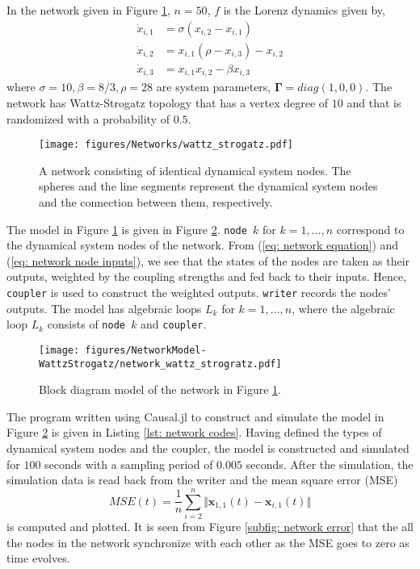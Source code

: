 \documentclass{juliacon}
\begin{document}
{In the network given in Figure \ref{fig: network graph}, $n=50$,  $f$ is the Lorenz dynamics given by,
\begin{equation}
    \begin{split}
        \dot{x}_{i,1} &= \sigma (x_{i, 2} - x_{i, 1}) \\
        \dot{x}_{i,2} &= x_{i, 1} (\rho -  x_{i, 3}) - x_{i, 2} \\
        \dot{x}_{i,3} &= x_{i, 1} x_{i, 2} - \beta x_{i, 3}
    \end{split}
\end{equation}
where $\sigma=10, \beta=8/3, \rho=28$ are system parameters, $\bm{\Gamma} = diag(1, 0, 0)$. The network has Wattz-Strogatz topology that has a vertex degree of $10$ and that is randomized with a probability of $0.5$\cite{watts1998collective}.

\begin{figure}
    \centering
    \texttt{[image: figures/Networks/wattz\_strogatz.pdf]}    
    \caption{A network consisting of identical dynamical system nodes. The spheres and the line segments represent the dynamical system nodes and the connection between them, respectively.}
    \label{fig: network graph}
\end{figure}

The model in Figure \ref{fig: network graph} is given in Figure \ref{fig: network model}. \texttt{node $k$} for $k =1, \ldots, n$ correspond to the dynamical system nodes of the network.  From (\ref{eq: network equation}) and (\ref{eq: network node inputs}), we see that the states of the nodes are taken as their outputs, weighted by the coupling strengths and fed back to their inputs. Hence, \texttt{coupler} is used to construct the weighted outputs. \texttt{writer} records the nodes' outputs. The model has algebraic loops $L_k$ for $k = 1, \ldots, n$, where the algebraic loop $L_k$ consists of \texttt{node $k$} and \texttt{coupler}. 

\begin{figure}
    \centering
    \texttt{[image: figures/NetworkModel-WattzStrogatz/network\_wattz\_strogratz.pdf]}
    \caption{Block diagram model of the network in Figure \ref{fig: network graph}.}
    \label{fig: network model}
\end{figure}

The program written using Causal.jl to construct and simulate the model in Figure \ref{fig: network model} is given in Listing \ref{lst: network codes}. Having defined the types of dynamical system nodes and the coupler, the model is constructed and simulated for $100$ seconds with a sampling period of $0.005$ seconds. After the simulation, the simulation data is read back from the writer and the mean square error (MSE) 
\begin{equation}
    MSE(t) = \dfrac{1}{n} \sum_{i = 2}^n \Vert \bm{x}_{1,1}(t) - \bm{x}_{i,1}(t) \Vert
\end{equation}
is computed and plotted. It is seen from Figure \ref{subfig: network error} that the all the nodes in the network synchronize with each other as the MSE goes to zero as time evolves. 

}
\end{document}
